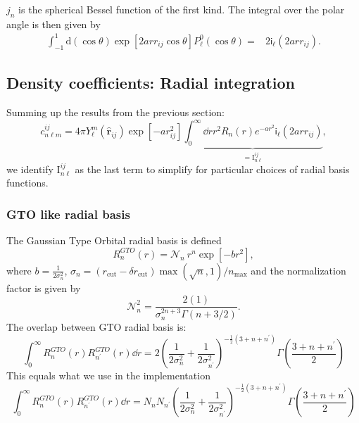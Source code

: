 \documentclass[
journal=jctcce, %
manuscript=article, layout=onecolumn]{achemso}
\begin{document}

 $j_n$ is the spherical Bessel function of the first kind.
 The integral over the polar angle is then given by
\begin{equation}
\begin{split}
\int_{-1}^{1}\mathrm{d}\left(\cos{\theta}\right) \exp\left[2arr_{ij}\cos{\theta}\right]P_{\ell}^{0}\left(\cos{\theta}\right) =& 2 \mathsf{i}_{\ell}(2arr_{ij}). 
\end{split}
\end{equation}



\subsection{Density coefficients: Radial integration}
Summing up the results from the previous section:
\begin{equation}
c^{ij}_{n\ell m} = 4\pi Y_{\ell}^m(\hat{\mathbf{r}}_{ij}) \exp\left[-ar^2_{ij}\right] \underbrace{\int_0^\infty \dd{r} r^2 R_n(r) e^{-ar^2} \mathsf{i}_{\ell}\left(2a r r_{ij}\right)}_{=\text{I}_{n\ell}^{ij}} ,
\end{equation}
we identify $\text{I}_{n\ell}^{ij}$ as the last term to simplify for particular choices of radial basis functions.

\subsubsection{GTO like radial basis}
The Gaussian Type Orbital radial basis is defined
\begin{equation}
   R^{GTO}_{n}(r) = \mathcal{N}_n\ r^{n} \exp[-br^2],
\end{equation}
where $b=\frac{1}{2\sigma_n^2}$, $\sigma_n = (r_\text{cut}-\delta r_\text{cut}) \max(\sqrt{n},1)/n_\text{max}$ and the normalization factor is given by
\begin{equation}
\mathcal{N}_n^2 = \frac{2(1)}{\sigma_n^{2n + 3}\Gamma(n + 3/2)}.
\end{equation}
The overlap between GTO radial basis is:
$$\int_0^\infty R^{GTO}_{n}(r) R^{GTO}_{n^\prime}(r) \dd{r}= 2 \left(\frac{1}{2 \sigma_{n}^2}+\frac{1}{2 \sigma_{n^\prime}^2} \right)^{-\frac{1}{2} (3+n+n^\prime)} \Gamma(\frac{3+n+n^\prime}{2}) $$
This equals what we use in the implementation
$$\int_0^\infty R^{GTO}_{n}(r) R^{GTO}_{n^\prime}(r) \dd{r}= N_n N_{n^\prime} \left(\frac{1}{2 \sigma_{n}^2}+\frac{1}{2 \sigma_{n^\prime}^2} \right)^{-\frac{1}{2} (3+n+n^\prime)} \Gamma(\frac{3+n+n^\prime}{2}) $$
\end{document}
